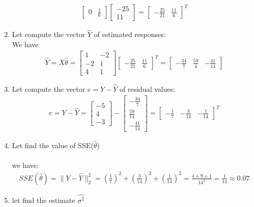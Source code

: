 \documentclass[12pt,a4paper]{article}
\begin{document}
\begin{enumerate}
\begin{align}
\begin{bmatrix}
0&\frac{1}{6}
\end{bmatrix}\begin{bmatrix}
-25\\
11
\end{bmatrix} = \begin{bmatrix}
-\frac{25}{21}&
\frac{11}{6}
\end{bmatrix}^{T}
\end{align}
\item Let compute the vector $\hat{Y}$ of estimated responses:\\
We have \begin{align}
	\hat{Y} = X\hat{\theta}=\begin{bmatrix}
		1&-2\\
		-2&1\\
		4&1
	\end{bmatrix}\begin{bmatrix}
	-\frac{25}{21}&
	\frac{11}{6}
\end{bmatrix}^{T}=\begin{bmatrix}
-\frac{34}{7}&\frac{59}{4}&-\frac{41}{14}
\end{bmatrix}
\end{align}
\item Let compute the vector $e = Y-\hat{Y}$ of residual values:
\begin{align}
	e = Y-\hat{Y} = \begin{bmatrix}
		-5\\
		4\\
		-3
	\end{bmatrix}-\begin{bmatrix}
	-\frac{34}{7}\\
	\frac{59}{14}\\
	-\frac{41}{14}
\end{bmatrix} = \begin{bmatrix}
-\frac{1}{7}&-\frac{3}{14}&-\frac{1}{14}
\end{bmatrix}^{T}
\end{align}
\item Let find the value of SSE($\hat{\theta}$)\\
\\we have: \begin{align}
	SSE(\hat{\theta}) = \|Y-\hat{Y}\|_{2}^{2} = (\frac{1}{7})^{2}+(\frac{3}{14})^{2}+ (\frac{1}{14})^{2}= \frac{4+9+1}{14^{2}} = \frac{1}{14} \approx 0.07
\end{align}
\item let find the estimate $\hat{\sigma^{2}}^{}$\\

\end{enumerate}
\end{document}

